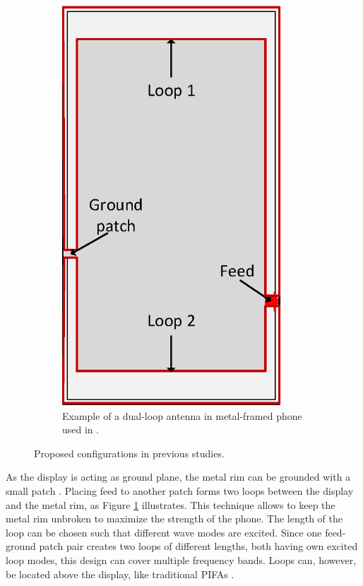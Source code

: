 \begin{figure}[ht!]
\begin{subfigure}[b]{0.4\textwidth}
        \includegraphics[width=0.9\textwidth]{img/dual_loop.eps}
        \caption{Example of a dual-loop antenna in metal-framed phone used in \cite{ban_dual_loop, stanley_lte_mimo}.}
        \label{fig:dual_loop}
    \end{subfigure}
    \caption{Proposed configurations in previous studies.}
    \label{fig:metal_rim_examples}
\end{figure}

As the display is acting as ground plane, the metal rim can be grounded with a small patch \cite{ban_dual_loop, stanley_lte_mimo}. Placing feed to another patch forms two loops between the display and the metal rim, as Figure \ref{fig:dual_loop} illustrates. This technique allows to keep the metal rim unbroken to maximize the strength of the phone. The length of the loop can be chosen such that different wave modes are excited. Since one feed-ground patch pair creates two loops of different lengths, both having own excited loop modes, this design can cover multiple frequency bands. Loops can, however, be located above the display, like traditional PIFAs \cite{reconf_narrow,hybrid}. %

